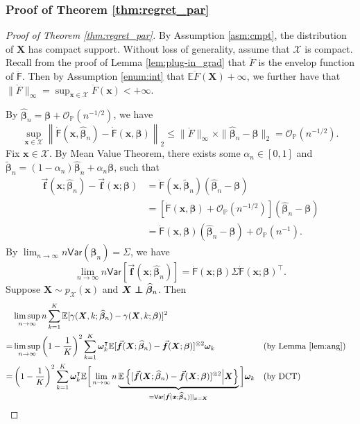 \documentclass[11pt]{article}
\numberwithin{equation}{section}
\theoremstyle{definition}
\theoremstyle{remark}
\newcommand{\bbf}{\bm{f}}
\newcommand{\bx}{\bm{x}}
\newcommand{\bX}{\bm{X}}
\newcommand{\bbeta}{\bm{\beta}}
\newcommand{\bomega}{\bm{\omega}}
\newcommand{\bbE}{\mathbb{E}}
\newcommand{\bbP}{\mathbb{P}}
\newcommand{\cO}{\mathcal{O}}
\newcommand{\cX}{\mathcal{X}}
\newcommand{\sX}{\mathscr{X}}
\newcommand{\sfF}{\mathsf{F}}
\newcommand{\sfvar}{\mathsf{Var}}
\newcommand\indep{\protect\mathpalette{\protect\independenT}{\perp}}
\def\independenT#1#2{\mathrel{\rlap{$#1#2$}\mkern2mu{#1#2}}}	%
\begin{document}
\subsubsection{Proof of Theorem \ref{thm:regret_par}}

\begin{proof}[Proof of Theorem \ref{thm:regret_par}] By Assumption \ref{asm:cmpt}, the distribution of $ \bX $ has compact support. Without loss of generality, assume that $ \cX $ is compact. Recall from the proof of Lemma \ref{lem:plug-in_grad} that $ \ddot{F} $ is the envelop function of $ \ddot{\sfF} $. Then by Assumption \ref{enum:int} that $ \bbE \ddot{F}(\bX) +\infty $, we further have that $ \| \ddot{F} \|_{\infty} = \sup_{\bx \in \cX}\ddot{F}(\bx) < +\infty $.
	
	By $ \widehat{\bbeta}_{n} = \bbeta + \cO_{\bbP}(n^{-1/2}) $, we have
	\[ \sup_{\bx \in \cX}\left \| \dot{\sfF}(\bx,\widehat{\bbeta}_{n}) - \dot{\sfF}(\bx,\bbeta) \right \|_{2} \le \|\ddot{F}\|_{\infty} \times \| \widehat{\bbeta}_{n} - \bbeta \|_{2} = \cO_{\bbP}(n^{-1/2}). \]
	Fix $ \bx \in \cX $. By Mean Value Theorem, there exists some $ \alpha_{n} \in [0,1] $ and $ \widetilde{\bbeta}_{n} = (1 - \alpha_{n})\widehat{\bbeta}_{n} + \alpha_{n}\bbeta $, such that
	\begin{align*}
		\vec{\bbf}(\bx;\widehat{\bbeta}_{n}) - \vec{\bbf}(\bx;\bbeta)
		&= \dot{\sfF}(\bx,\widetilde{\bbeta}_{n})(\widehat{\bbeta}_{n} - \bbeta)\\
		&= [\dot{\sfF}(\bx,\bbeta) + \cO_{\bbP}(n^{-1/2})](\widehat{\bbeta}_{n} - \bbeta) \\
		&= \dot{\sfF}(\bx,\bbeta)(\widehat{\bbeta}_{n} - \bbeta) + \cO_{\bbP}(n^{-1}).
	\end{align*}
	By $ \lim_{n\to\infty}n\sfvar(\widehat{\bbeta}_{n}) = \Sigma $, we have
	\[ \lim_{n\to\infty}n\sfvar[\vec{\bbf}(\bx;\widehat{\bbeta}_{n})] = \dot{\sfF}(\bx;\bbeta)\Sigma\dot{\sfF}(\bx;\bbeta)^{\intercal}. \]
	Suppose $ \bX \sim p_{\sX}(\bx) $ and $ \bX \indep \widehat{\bbeta}_{n} $. Then
	\begin{align*}
		&\limsup_{n\to\infty}n\sum_{k=1}^{K}\bbE[\gamma(\bX,k;\widehat{\bbeta}_{n}) - \gamma(\bX,k;\bbeta)]^{2} \\
		=& \limsup_{n\to\infty}\left( 1 - {1 \over K} \right)^{2}\sum_{k=1}^{K}\bomega_{k}^{\intercal}\bbE  [\vec{\bbf}(\bX;\widehat{\bbeta}_{n}) - \vec{\bbf}(\bX;\bbeta)]^{\otimes 2}\bomega_{k} &&(\text{by Lemma \ref{lem:ang}}) \\
		=& \left( 1 - {1 \over K} \right)^{2}\sum_{k=1}^{K}\bomega_{k}^{\intercal}\bbE\bigg[\lim_{n\to\infty}n\underbrace{\bbE\left\{  [\vec{\bbf}(\bX;\widehat{\bbeta}_{n}) - \vec{\bbf}(\bX;\bbeta)]^{\otimes 2}\middle|\bX \right\}}_{= \sfvar[\vec{\bbf}(\bx;\widehat{\bbeta}_{n})]|_{\bx = \bX}}\bigg]\bomega_{k}  &&\text{(by DCT)}\\

\end{align*}
\end{proof}
\end{document}
